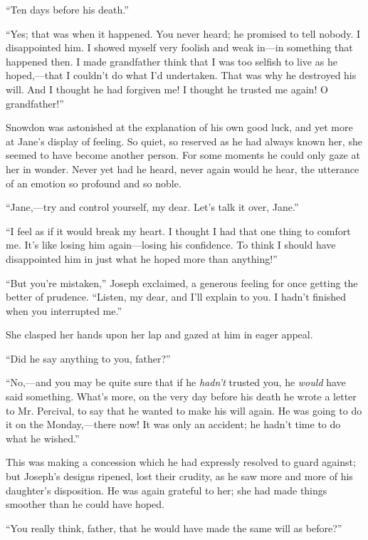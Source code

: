 ``Ten days before his death.''

``Yes; that was when it happened. You never heard; he promised to tell
nobody. I disappointed him. I showed myself very foolish and weak
in---in something that happened then. I made grandfather think that I
was too selfish to live as he hoped,---that I couldn't do what I'd
undertaken. That was why he destroyed his will. And I thought he had
forgiven me! I thought he trusted me again! O grandfather!''

Snowdon was astonished at the explanation of his own good luck, and yet
more at Jane's display of feeling. So quiet, so reserved as he had
always known her, she seemed to have become another person. For some
moments he could only gaze at her in wonder. Never yet had he heard,
never again would he hear, {\protect\hypertarget{231}{}{}}the utterance
of an emotion so profound and so noble.

``Jane,---try and control yourself, my dear. Let's talk it over, Jane.''

``I feel as if it would break my heart. I thought I had that one thing
to comfort me. It's like losing him again---losing his confidence. To
think I should have disappointed him in just what he hoped more than
anything!''

``But you're mistaken,'' Joseph exclaimed, a generous feeling for once
getting the better of prudence. ``Listen, my dear, and I'll explain to
you. I hadn't finished when you interrupted me.''

She clasped her hands upon her lap and gazed at him in eager appeal.

``Did he say anything to you, father?''

``No,---and you may be quite sure that if he \emph{hadn't} trusted you,
he \emph{would} have said something. What's more, on the very day before
his death he wrote a letter to Mr. Percival, to say that he wanted to
make his will again. He was going to do it on the Monday,---there now!
It was only an accident; he hadn't time to do what he wished.''

{\protect\hypertarget{232}{}{}}This was making a concession which he had
expressly resolved to guard against; but Joseph's designs ripened, lost
their crudity, as he saw more and more of his daughter's disposition. He
was again grateful to her; she had made things smoother than he could
have hoped.

``You really think, father, that he would have made the same will as
before?''


